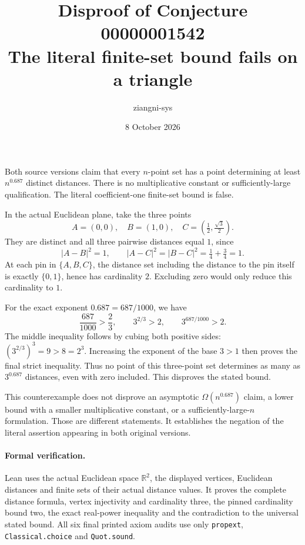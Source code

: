 \documentclass[11pt]{article}
\title{Disproof of Conjecture 00000001542\\The literal finite-set bound fails on a triangle}
\author{ziangni-sys}
\date{8 October 2026}
\begin{document}
\maketitle
Both source versions claim that every $n$-point set has a point determining at least $n^{0.687}$ distinct distances. There is no multiplicative constant or sufficiently-large qualification. The literal coefficient-one finite-set bound is false.

In the actual Euclidean plane, take the three points
\[
 A=(0,0),\quad B=(1,0),\quad C=\left(\tfrac12,\tfrac{\sqrt3}{2}\right).
\]
They are distinct and all three pairwise distances equal $1$, since
\[
 |A-B|^2=1,\qquad |A-C|^2=|B-C|^2=\tfrac14+\tfrac34=1.
\]
At each pin in $\{A,B,C\}$, the distance set including the distance to the pin itself is exactly $\{0,1\}$, hence has cardinality $2$. Excluding zero would only reduce this cardinality to $1$.

For the exact exponent $0.687=687/1000$, we have
\[
 \frac{687}{1000}>\frac23,\qquad 3^{2/3}>2,
 \qquad 3^{687/1000}>2.
\]
The middle inequality follows by cubing both positive sides: $(3^{2/3})^3=9>8=2^3$. Increasing the exponent of the base $3>1$ then proves the final strict inequality. Thus no point of this three-point set determines as many as $3^{0.687}$ distances, even with zero included. This disproves the stated bound.

This counterexample does not disprove an asymptotic $\Omega(n^{0.687})$ claim, a lower bound with a smaller multiplicative constant, or a sufficiently-large-$n$ formulation. Those are different statements. It establishes the negation of the literal assertion appearing in both original versions.

\paragraph{Formal verification.}
Lean uses the actual Euclidean space $\mathbb R^2$, the displayed vertices, Euclidean distances and finite sets of their actual distance values. It proves the complete distance formula, vertex injectivity and cardinality three, the pinned cardinality bound two, the exact real-power inequality and the contradiction to the universal stated bound. All six final printed axiom audits use only \texttt{propext}, \texttt{Classical.choice} and \texttt{Quot.sound}.
\end{document}

